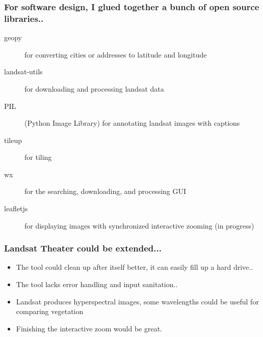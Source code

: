 \documentclass{beamer}
\begin{document}

    \begin{frame}
        \frametitle{For software design, I glued together a bunch of open source libraries..}
        \begin{description}
            \item[geopy] for converting cities or addresses to latitude and longitude
            \item[landsat-utils] for downloading and processing landsat data
            \item[PIL] (Python Image Library) for annotating landsat images with captions
            \item[tileup] for tiling
            \item[wx] for the searching, downloading, and processing GUI
            \item[leafletjs] for displaying images with synchronized interactive zooming (in progress)
        \end{description}
    \end{frame}
 
    \begin{frame}
        \frametitle{Landsat Theater could be extended...}
        \begin{itemize}
            \item The tool could clean up after itself better, it can easily fill up a hard drive..
            \item The tool lacks error handling and input sanitation.. 
            \item Landsat produces hyperspectral images, some wavelengths could be useful for comparing vegetation
            \item Finishing the interactive zoom would be great.
        \end{itemize}
    \end{frame}
\end{document}
